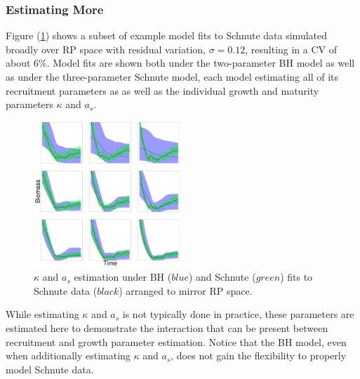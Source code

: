 %
\subsubsection{Estimating More\label{estMore}}

%
Figure (\ref{estAK}) shows a subset of example model fits to Schnute data 
simulated broadly over RP space with residual variation, $\sigma=0.12$, 
resulting in a CV of about 6\%.
Model fits are shown both under the two-parameter BH model as well as under the
three-parameter Schnute model, each model estimating all of its recruitment parameters as  
as well as the individual growth and maturity parameters $\kappa$ and $a_s$.
\begin{figure}
\includegraphics[width=0.49\textwidth]{../ddBias/indexGridKAExpT45N300A0-1AS10K0.1.png}
\caption{
$\kappa$ and $a_s$ estimation under BH ($blue$) and Schnute ($green$) fits to
Schnute data ($black$) arranged to mirror RP space. %
}\label{estAK}
\end{figure}
While estimating $\kappa$ and $a_s$ is not typically done in practice, these 
parameters are estimated here to demonstrate the interaction that can be present 
between recruitment and growth parameter estimation. Notice that the BH model, even 
when additionally estimating $\kappa$ and $a_s$, does not gain the flexibility 
to properly model Schnute data.

